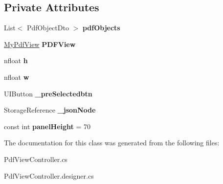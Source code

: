 \subsection*{Private Attributes}
\begin{DoxyCompactItemize}
\item 
\mbox{\label{class_ramboell_1_1i_o_s_1_1_pdf_view_controller_ae92538214df4571ae24ccded6da10609}} 
List$<$ Pdf\+Object\+Dto $>$ {\bfseries pdf\+Objects}
\item 
\mbox{\label{class_ramboell_1_1i_o_s_1_1_pdf_view_controller_a64fc418acef69d5ddf5991919135ecf3}} 
\hyperlink{class_ramboell_1_1i_o_s_1_1_pdf_view_controller_1_1_my_pdf_view}{My\+Pdf\+View} {\bfseries P\+D\+F\+View}
\item 
\mbox{\label{class_ramboell_1_1i_o_s_1_1_pdf_view_controller_aa49ce5510df519448c768cc7868f7533}} 
nfloat {\bfseries h}
\item 
\mbox{\label{class_ramboell_1_1i_o_s_1_1_pdf_view_controller_a8b30539f325520b3919609a87de383db}} 
nfloat {\bfseries w}
\item 
\mbox{\label{class_ramboell_1_1i_o_s_1_1_pdf_view_controller_a5505533213a5f82d5a34ca7c5514d5d8}} 
U\+I\+Button {\bfseries \+\_\+pre\+Selectedbtn}
\item 
\mbox{\label{class_ramboell_1_1i_o_s_1_1_pdf_view_controller_a7d098fbe2fd772475f1bcc6de9d665f9}} 
Storage\+Reference {\bfseries \+\_\+json\+Node}
\item 
\mbox{\label{class_ramboell_1_1i_o_s_1_1_pdf_view_controller_ab6de5c3b8d72a66479d9a681a7c692d7}} 
const int {\bfseries panel\+Height} = 70
\end{DoxyCompactItemize}


The documentation for this class was generated from the following files\+:\begin{DoxyCompactItemize}
\item 
Pdf\+View\+Controller.\+cs\item 
Pdf\+View\+Controller.\+designer.\+cs\end{DoxyCompactItemize}
